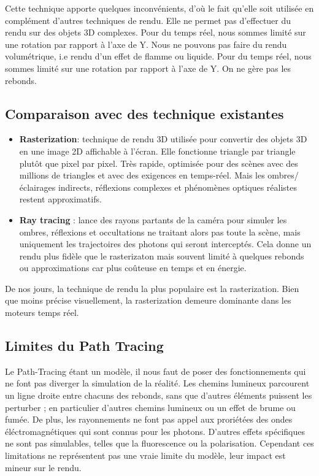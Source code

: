 Cette technique apporte quelques inconvénients, d'où le fait qu'elle soit utilisée en complément d'autres techniques de rendu. 
Elle ne permet pas d'effectuer du rendu sur des objets 3D complexes. Pour du temps réel, nous sommes limité sur une rotation par rapport à l'axe de Y. 
Nous ne pouvons pas faire du rendu volumétrique, i.e rendu d'un effet de flamme ou liquide. Pour du temps réel, nous sommes limité sur une rotation par rapport à l'axe de Y. 
On ne gère pas les rebonds.

\subsection{Comparaison avec des technique existantes}


\begin{itemize}
\item[$\bullet$]\textbf{Rasterization}: technique de rendu 3D utilisée pour convertir des objets 3D en une image 2D affichable à l'écran. Elle fonctionne triangle par triangle plutôt que pixel par pixel. Très rapide, optimisée pour des scènes avec des millions de triangles et avec des exigences en temps-réel. Mais les ombres/éclairages indirects, réflexions complexes et phénomènes optiques réalistes restent approximatifs. 

\item[$\bullet$] \textbf{Ray tracing }: lance des rayons partants de la caméra pour simuler les ombres, réflexions et occultations ne traitant alors pas toute la scène, mais uniquement les trajectoires des photons qui seront interceptés. Cela donne un rendu plus fidèle que le rasterizaton mais souvent limité à quelques rebonds ou approximations car plus coûteuse en temps et en énergie.

\end{itemize}

De nos jours, la technique de rendu la plus populaire est la rasterization. Bien que moins précise visuellement, la rasterization demeure dominante dans les moteurs temps réel.

\subsection{Limites du Path Tracing}

Le Path-Tracing étant un modèle, il nous faut de poser des fonctionnements qui ne font pas diverger la simulation de la réalité. Les chemins lumineux parcourent un ligne droite entre chacuns des rebonds, sans que d'autres éléments puissent les perturber ; en particulier d'autres chemins lumineux ou un effet de brume ou fumée. De plus, les rayonnements ne font pas appel aux proriétées des ondes éléctromagnétiques qui sont connus pour les photons. D'autres effets spécifiques ne sont pas simulables, telles que la fluorescence ou la polarisation. Cependant ces limitations ne représentent pas une vraie limite du modèle, leur impact est mineur sur le rendu.

